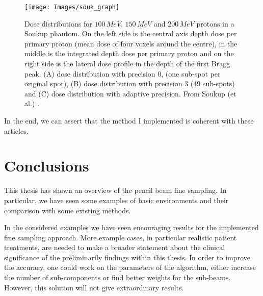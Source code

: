 \documentclass[12pt, a4paper, twoside]{book}
\begin{document}
\begin{figure}[!t]
\centering
{\texttt{[image: Images/souk\_graph]}} 
\caption{Dose distributions for $100\,MeV$, $150\,MeV$ and $200\,MeV$ protons in a Soukup phantom. On the left
side is the central axis depth dose per primary proton (mean dose of four voxels around the centre), in the middle is the integrated depth dose per primary proton and on the right side is the lateral dose profile in the depth of the first Bragg peak. (A) dose distribution with precision 0, (one sub-spot per original spot), (B) dose distribution with precision 3 (49 sub-spots) and (C) dose distribution with adaptive precision. From Soukup (et al.) \cite{souk:pba}.}
\label{fig:souk_graph}
\end{figure}

In the end, we can assert that the method I implemented is coherent with these articles.


\chapter{Conclusions} %

This thesis has shown an overview of the pencil beam fine sampling. In particular, we have seen some examples of basic environments and their comparison with some existing methods. 


In the considered examples we have seen encouraging results for the implemented fine sampling approach. More example cases, in particular realistic patient treatments, are needed to make a broader statement about the clinical significance of the preliminarily findings within this thesis. In order to improve the accuracy, one could work on the parameters of the algorithm, either increase the number of sub-components or find better weights for the sub-beams. However, this solution will not give extraordinary results.
\end{document}
